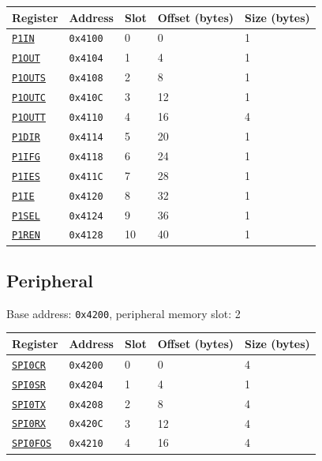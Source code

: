 \begin{tabularx}{\textwidth}{ l l l l X }
\textbf{Register} & \textbf{Address} & \textbf{Slot} & \textbf{Offset (bytes)} & \textbf{Size (bytes)} \\ \hline
\hyperref[ss:PxIN]{\texttt{P1IN}} & \texttt{0x4100} & 0 & 0 & 1 \\
\rowcolor{tablehighlightcolor} \hyperref[ss:PxOUT]{\texttt{P1OUT}} & \texttt{0x4104} & 1 & 4 & 1 \\
\hyperref[ss:PxOUTS]{\texttt{P1OUTS}} & \texttt{0x4108} & 2 & 8 & 1 \\
\rowcolor{tablehighlightcolor} \hyperref[ss:PxOUTC]{\texttt{P1OUTC}} & \texttt{0x410C} & 3 & 12 & 1 \\
\hyperref[ss:PxOUTT]{\texttt{P1OUTT}} & \texttt{0x4110} & 4 & 16 & 4 \\
\rowcolor{tablehighlightcolor} \hyperref[ss:PxDIR]{\texttt{P1DIR}} & \texttt{0x4114} & 5 & 20 & 1 \\
\hyperref[ss:PxIFG]{\texttt{P1IFG}} & \texttt{0x4118} & 6 & 24 & 1 \\
\rowcolor{tablehighlightcolor} \hyperref[ss:PxIES]{\texttt{P1IES}} & \texttt{0x411C} & 7 & 28 & 1 \\
\hyperref[ss:PxIE]{\texttt{P1IE}} & \texttt{0x4120} & 8 & 32 & 1 \\
\rowcolor{tablehighlightcolor} \hyperref[ss:PxSEL]{\texttt{P1SEL}} & \texttt{0x4124} & 9 & 36 & 1 \\
\hyperref[ss:PxREN]{\texttt{P1REN}} & \texttt{0x4128} & 10 & 40 & 1 \\
\hline
\end{tabularx}

\subsection{ Peripheral}
\noindent Base address: \texttt{0x4200}, peripheral memory slot: 2

\begin{tabularx}{\textwidth}{ l l l l X }
\textbf{Register} & \textbf{Address} & \textbf{Slot} & \textbf{Offset (bytes)} & \textbf{Size (bytes)} \\ \hline
\hyperref[ss:SPIxCR]{\texttt{SPI0CR}} & \texttt{0x4200} & 0 & 0 & 4 \\
\rowcolor{tablehighlightcolor} \hyperref[ss:SPIxSR]{\texttt{SPI0SR}} & \texttt{0x4204} & 1 & 4 & 1 \\
\hyperref[ss:SPIxTX]{\texttt{SPI0TX}} & \texttt{0x4208} & 2 & 8 & 4 \\
\rowcolor{tablehighlightcolor} \hyperref[ss:SPIxRX]{\texttt{SPI0RX}} & \texttt{0x420C} & 3 & 12 & 4 \\
\hyperref[ss:SPIxFOS]{\texttt{SPI0FOS}} & \texttt{0x4210} & 4 & 16 & 4 \\
\hline
\end{tabularx}

